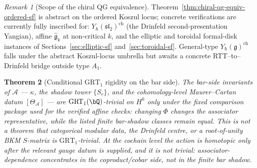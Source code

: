 \documentclass[11pt]{article}
\theoremstyle{plain}
\newtheorem{theorem}{Theorem}[section]
\theoremstyle{definition}
\theoremstyle{remark}
\newtheorem{remark}[theorem]{Remark}
\newcommand{\fg}{\mathfrak{g}}
\newcommand{\fsl}{\mathfrak{sl}}
\newcommand{\cA}{\mathcal{A}}
\begin{document}
\begin{remark}[Scope of the chiral QG equivalence]\label{rem:chiral-qg-scope-sf}
Theorem~\ref{thm:chiral-qg-equiv-ordered-sf} is abstract on the
ordered Koszul locus; concrete verifications are currently fully
inscribed for: $Y_\hbar(\fsl_2)^{\mathrm{ch}}$ (the Drinfeld
second-presentation Yangian), affine $\widehat{\fg}_k$ at
non-critical $k$, and the elliptic and toroidal formal-disk
instances of Sections~\ref{sec:elliptic-sf}
and~\ref{sec:toroidal-sf}. General-type
$Y_\hbar(\fg)^{\mathrm{ch}}$ falls under the abstract Koszul-locus
umbrella but awaits a concrete RTT--to--Drinfeld bridge outside
type $A_1$.
\end{remark}

\begin{theorem}[Conditional $\mathrm{GRT}_1$ rigidity on the bar
side]\label{thm:grt1-rigidity-sf}
\ClaimStatusConditional
The bar-side invariants of $\cA$ --- $\kappa$, the shadow tower
$\{S_r\}$, and the cohomology-level Maurer--Cartan datum $[\Theta_\cA]$
--- are $\mathrm{GRT}_1(\bQ)$-trivial on $H^0$ only under the
fixed comparison package used for the verified affine checks:
changing $\Phi$ changes the associator representative, while the
listed finite bar-shadow classes remain equal. This is not a theorem
that categorical modular data, the Drinfeld centre, or a
root-of-unity BKM $S$-matrix is $\mathrm{GRT}_1$-trivial. At the
cochain level the action is homotopic only after the relevant gauge
datum is supplied, and it is not trivial: associator-dependence
concentrates in the coproduct/cobar side, not in the finite bar
shadow.
\end{theorem}
\end{document}
